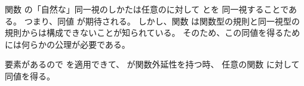 \documentclass[index]{subfiles}
\begin{document}

関数
の「自然な」同一視のしかたは任意のに対して
とを
同一視することである。
つまり、同値
が期待される。
しかし、関数
は関数型の規則と同一視型の規則からは構成できないことが知られている。
そのため、この同値を得るためには何らかの公理が必要である。



要素があるので
を適用できて、
が関数外延性を持つ時、
任意の関数
に対して同値を得る。




\begin{myShiftSections}
  
\end{myShiftSections}
\end{document}
